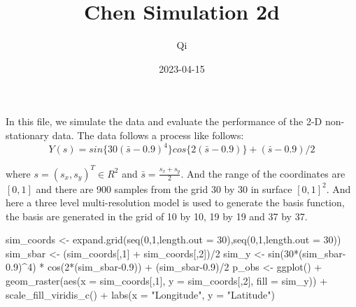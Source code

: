 \documentclass[
]{article}
\title{Chen Simulation 2d}
\author{Qi}
\date{2023-04-15}
\newenvironment{Shaded}{\begin{snugshade}}{\end{snugshade}}
\newcommand{\AttributeTok}[1]{\textcolor[rgb]{0.77,0.63,0.00}{#1}}
\newcommand{\DecValTok}[1]{\textcolor[rgb]{0.00,0.00,0.81}{#1}}
\newcommand{\FloatTok}[1]{\textcolor[rgb]{0.00,0.00,0.81}{#1}}
\newcommand{\FunctionTok}[1]{\textcolor[rgb]{0.00,0.00,0.00}{#1}}
\newcommand{\NormalTok}[1]{#1}
\newcommand{\OtherTok}[1]{\textcolor[rgb]{0.56,0.35,0.01}{#1}}
\newcommand{\SpecialCharTok}[1]{\textcolor[rgb]{0.00,0.00,0.00}{#1}}
\newcommand{\StringTok}[1]{\textcolor[rgb]{0.31,0.60,0.02}{#1}}
\begin{document}
\maketitle

In this file, we simulate the data and evaluate the performance of the
2-D non-stationary data. The data follows a process like follows:
\[Y(s) = sin\{30(\bar{s}-0.9)^4\}cos\{ 2(\bar{s}-0.9)\} + (\bar{s}-0.9)/2\]

where \(s = (s_x, s_y)^T \in R^2\) and \(\bar{s}= \frac{s_x+s_y}{2}\).
And the range of the coordinates are \([0,1]\) and there are 900 samples
from the grid 30 by 30 in surface \([0,1]^2\). And here a three level
multi-resolution model is used to generate the basis function, the basis
are generated in the grid of 10 by 10, 19 by 19 and 37 by 37.

\begin{Shaded}
\begin{Highlighting}[]
\NormalTok{sim\_coords }\OtherTok{\textless{}{-}} \FunctionTok{expand.grid}\NormalTok{(}\FunctionTok{seq}\NormalTok{(}\DecValTok{0}\NormalTok{,}\DecValTok{1}\NormalTok{,}\AttributeTok{length.out =} \DecValTok{30}\NormalTok{),}\FunctionTok{seq}\NormalTok{(}\DecValTok{0}\NormalTok{,}\DecValTok{1}\NormalTok{,}\AttributeTok{length.out =} \DecValTok{30}\NormalTok{))}
\NormalTok{sim\_sbar }\OtherTok{\textless{}{-}}\NormalTok{ (sim\_coords[,}\DecValTok{1}\NormalTok{] }\SpecialCharTok{+}\NormalTok{ sim\_coords[,}\DecValTok{2}\NormalTok{])}\SpecialCharTok{/}\DecValTok{2}
\NormalTok{sim\_y }\OtherTok{\textless{}{-}} \FunctionTok{sin}\NormalTok{(}\DecValTok{30}\SpecialCharTok{*}\NormalTok{(sim\_sbar}\FloatTok{{-}0.9}\NormalTok{)}\SpecialCharTok{\^{}}\DecValTok{4}\NormalTok{) }\SpecialCharTok{*} \FunctionTok{cos}\NormalTok{(}\DecValTok{2}\SpecialCharTok{*}\NormalTok{(sim\_sbar}\FloatTok{{-}0.9}\NormalTok{)) }\SpecialCharTok{+}\NormalTok{ (sim\_sbar}\FloatTok{{-}0.9}\NormalTok{)}\SpecialCharTok{/}\DecValTok{2}
\NormalTok{p\_obs }\OtherTok{\textless{}{-}} 
\FunctionTok{ggplot}\NormalTok{() }\SpecialCharTok{+}
  \FunctionTok{geom\_raster}\NormalTok{(}\FunctionTok{aes}\NormalTok{(}\AttributeTok{x =}\NormalTok{ sim\_coords[,}\DecValTok{1}\NormalTok{], }\AttributeTok{y =}\NormalTok{ sim\_coords[,}\DecValTok{2}\NormalTok{], }\AttributeTok{fill =}\NormalTok{ sim\_y)) }\SpecialCharTok{+}
  \FunctionTok{scale\_fill\_viridis\_c}\NormalTok{() }\SpecialCharTok{+} 
  \FunctionTok{labs}\NormalTok{(}\AttributeTok{x =} \StringTok{"Longitude"}\NormalTok{,  }\AttributeTok{y =} \StringTok{"Latitude"}\NormalTok{)}


\end{Highlighting}
\end{Shaded}
\end{document}
